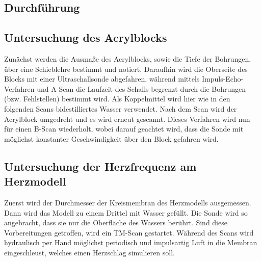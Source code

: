 \subsection{Durchführung}
\label{sec:durchführung}
\subsection{Untersuchung des Acrylblocks}
Zunächst werden die Ausmaße des Acrylblocks, sowie die Tiefe der Bohrungen, über eine Schieblehre bestimmt und notiert.
Daraufhin wird die Oberseite des Blocks mit einer Ultraschallsonde abgefahren, während mittels Impuls-Echo-Verfahren und A-Scan die Laufzeit des Schalls begrenzt durch die Bohrungen (bzw. Fehlstellen) bestimmt wird.
Als Koppelmittel wird hier wie in den folgenden Scans bidestilliertes Wasser verwendet.
Nach dem Scan wird der Acrylblock umgedreht und es wird erneut gescannt.
Dieses Verfahren wird nun für einen B-Scan wiederholt, wobei darauf geachtet wird, dass die Sonde mit möglichst konstanter Geschwindigkeit über den Block gefahren wird.

\subsection{Untersuchung der Herzfrequenz am Herzmodell}
Zuerst wird der Durchmesser der Kreismembran des Herzmodells ausgemessen.
Dann wird das Modell zu einem Drittel mit Wasser gefüllt.
Die Sonde wird so angebracht, dass sie nur die Oberfläche des Wassers berührt.
Sind diese Vorbereitungen getroffen, wird ein TM-Scan gestartet.
Während des Scans wird hydraulisch per Hand möglichst periodisch und impulsartig Luft in die Membran eingeschleust, welches einen Herzschlag simulieren soll.
